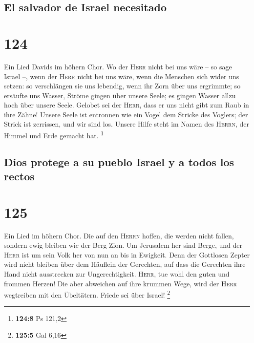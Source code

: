 \hypertarget{el-salvador-de-israel-necesitado}{%
\subsection{El salvador de Israel
necesitado}\label{el-salvador-de-israel-necesitado}}

\hypertarget{section-123}{%
\section{124}\label{section-123}}

 Ein Lied Davids im höhern Chor. Wo der \textsc{Herr}
nicht bei uns wäre -- so sage Israel --,  wenn der
\textsc{Herr} nicht bei uns wäre, wenn die Menschen sich wider uns
setzen:  so verschlängen sie uns lebendig, wenn ihr Zorn
über uns ergrimmte;  so ersäufte uns Wasser, Ströme gingen
über unsere Seele;  es gingen Wasser allzu hoch über
unsere Seele.  Gelobet sei der \textsc{Herr}, dass er uns
nicht gibt zum Raub in ihre Zähne!  Unsere Seele ist
entronnen wie ein Vogel dem Stricke des Voglers; der Strick ist
zerrissen, und wir sind los.  Unsere Hilfe steht im Namen
des \textsc{Herrn}, der Himmel und Erde gemacht hat. \footnote{\textbf{124:8}
  Ps 121,2}

\hypertarget{dios-protege-a-su-pueblo-israel-y-a-todos-los-rectos}{%
\subsection{Dios protege a su pueblo Israel y a todos los
rectos}\label{dios-protege-a-su-pueblo-israel-y-a-todos-los-rectos}}

\hypertarget{section-124}{%
\section{125}\label{section-124}}

 Ein Lied im höhern Chor. Die auf den \textsc{Herrn}
hoffen, die werden nicht fallen, sondern ewig bleiben wie der Berg Zion.
 Um Jerusalem her sind Berge, und der \textsc{Herr} ist um
sein Volk her von nun an bis in Ewigkeit.  Denn der
Gottlosen Zepter wird nicht bleiben über dem Häuflein der Gerechten, auf
dass die Gerechten ihre Hand nicht ausstrecken zur Ungerechtigkeit.
 \textsc{Herr}, tue wohl den guten und frommen Herzen!
 Die aber abweichen auf ihre krummen Wege, wird der
\textsc{Herr} wegtreiben mit den Übeltätern. Friede sei über Israel!
\footnote{\textbf{125:5} Gal 6,16}

